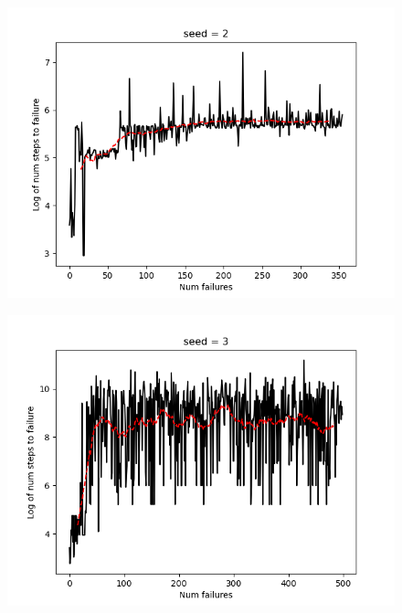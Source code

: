 \documentclass[11pt, a4paper]{article}
\begin{document}
    \begin{figure}[htbp]
        \centering
        \includegraphics[width=\linewidth]{figure/control_2.png}
    \end{figure}

    \begin{figure}[htbp]
        \centering
        \includegraphics[width=\linewidth]{figure/control_3.png}
    \end{figure}
\end{document}
